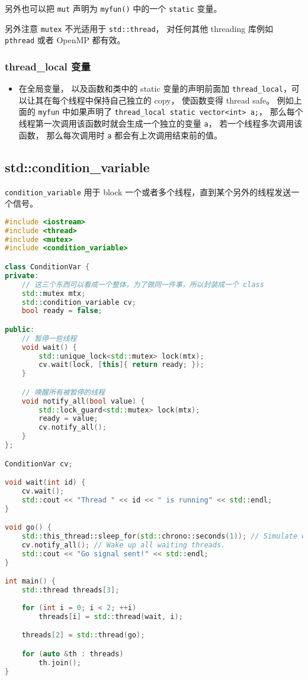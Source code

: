 另外也可以把 \verb|mut| 声明为 \verb|myfun()| 中的一个 \verb|static| 变量。

另外注意 \verb|mutex| 不光适用于 \verb|std::thread|， 对任何其他 threading 库例如 \verb|pthread| 或者 OpenMP 都有效。


\subsubsection{thread\_local 变量}
\begin{itemize}
\item 在全局变量， 以及函数和类中的 static 变量的声明前面加 \verb|thread_local|，可以让其在每个线程中保持自己独立的 copy， 使函数变得 thread safe。 例如上面的 \verb|myfun| 中如果声明了 \verb|thread_local static vector<int> a;|， 那么每个线程第一次调用该函数时就会生成一个独立的变量 \verb|a|， 若一个线程多次调用该函数， 那么每次调用时 \verb|a| 都会有上次调用结束前的值。
\end{itemize}

\subsection{std::condition\_variable}
\verb`condition_variable` 用于 block 一个或者多个线程，直到某个另外的线程发送一个信号。

\begin{lstlisting}[language=cpp]
#include <iostream>
#include <thread>
#include <mutex>
#include <condition_variable>

class ConditionVar {
private:
    // 这三个东西可以看成一个整体，为了做同一件事，所以封装成一个 class
    std::mutex mtx;
    std::condition_variable cv;
    bool ready = false;

public:
    // 暂停一些线程
    void wait() {
        std::unique_lock<std::mutex> lock(mtx);
        cv.wait(lock, [this]{ return ready; });
    }

    // 唤醒所有被暂停的线程
    void notify_all(bool value) {
        std::lock_guard<std::mutex> lock(mtx);
        ready = value;
        cv.notify_all();
    }
};

ConditionVar cv;

void wait(int id) {
    cv.wait();
    std::cout << "Thread " << id << " is running" << std::endl;
}

void go() {
    std::this_thread::sleep_for(std::chrono::seconds(1)); // Simulate work.
    cv.notify_all(); // Wake up all waiting threads.
    std::cout << "Go signal sent!" << std::endl;
}

int main() {
    std::thread threads[3];
    
    for (int i = 0; i < 2; ++i)
        threads[i] = std::thread(wait, i);

    threads[2] = std::thread(go);

    for (auto &th : threads)
        th.join();
}
\end{lstlisting}
